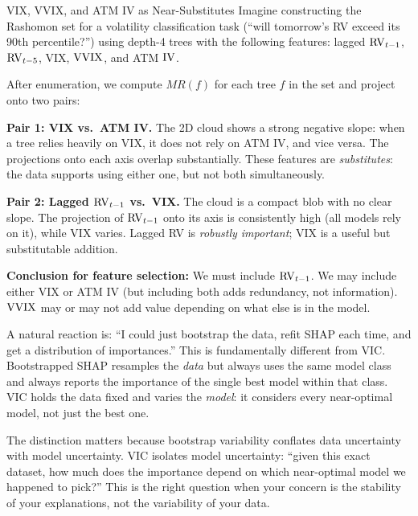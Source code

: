 \begin{workedexample}{VIX, VVIX, and ATM IV as Near-Substitutes}
Imagine constructing the Rashomon set for a volatility classification task
(``will tomorrow's RV exceed its 90th percentile?'') using depth-4 trees
with the following features: lagged $\operatorname{RV}_{t-1}$, $\operatorname{RV}_{t-5}$, VIX, $\operatorname{VVIX}$,
and ATM $\operatorname{IV}$.

After enumeration, we compute $MR(f)$ for each tree $f$ in the set and
project onto two pairs:

\textbf{Pair 1: VIX vs.\ ATM IV.}  The 2D cloud shows a strong negative
slope: when a tree relies heavily on VIX, it does not rely on ATM IV, and
vice versa.  The projections onto each axis overlap substantially.  These
features are \emph{substitutes}: the data supports using either one, but not
both simultaneously.

\textbf{Pair 2: Lagged $\operatorname{RV}_{t-1}$ vs.\ VIX.}  The cloud is a compact blob
with no clear slope.  The projection of $\operatorname{RV}_{t-1}$ onto its axis is
consistently high (all models rely on it), while VIX varies.  Lagged RV is
\emph{robustly important}; VIX is a useful but substitutable addition.

\medskip
\noindent\textbf{Conclusion for feature selection:}  We must include
$\operatorname{RV}_{t-1}$.  We may include either VIX or ATM IV (but including both adds
redundancy, not information).  $\operatorname{VVIX}$ may or may not add value depending on
what else is in the model.
\end{workedexample}

\begin{keyidea}
A natural reaction is: ``I could just bootstrap the data, refit SHAP each
time, and get a distribution of importances.''  This is fundamentally
different from VIC.  Bootstrapped SHAP resamples the \emph{data} but always
uses the same model class and always reports the importance of the single
best model within that class.  VIC holds the data fixed and varies the
\emph{model}: it considers every near-optimal model, not just the best one.

The distinction matters because bootstrap variability conflates data
uncertainty with model uncertainty.  VIC isolates model uncertainty: ``given
this exact dataset, how much does the importance depend on which near-optimal
model we happened to pick?''  This is the right question when your concern
is the stability of your explanations, not the variability of your data.
\end{keyidea}

